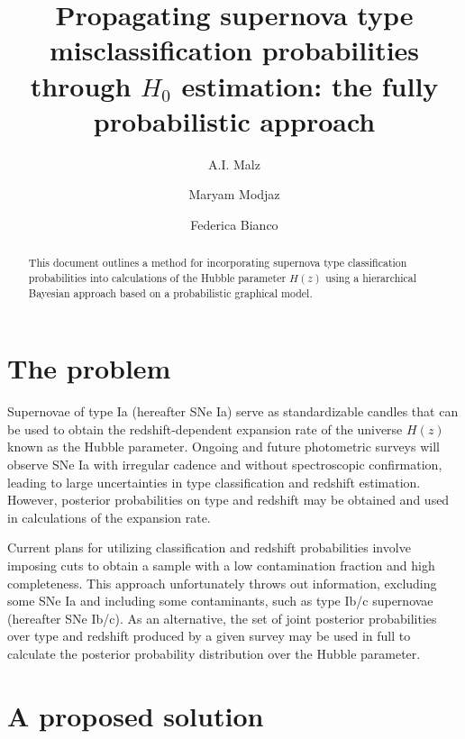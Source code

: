 \documentclass[12pt, onecolumn]{emulateapj}
\begin{document}
\title{Propagating supernova type misclassification probabilities through $H_{0}$ estimation: the fully probabilistic approach}

\author{A.I. Malz}
\author{Maryam Modjaz}
\author{Federica Bianco}

\begin{abstract}
This document outlines a method for incorporating supernova type classification probabilities into calculations of the Hubble parameter $H(z)$ using a hierarchical Bayesian approach based on a probabilistic graphical model.
\end{abstract}

\keywords{}

\section{The problem}
\label{sec:intro}

Supernovae of type Ia (hereafter SNe Ia) serve as standardizable candles that can be used to obtain the redshift-dependent expansion rate of the universe $H(z)$ known as the Hubble parameter.  Ongoing and future photometric surveys will observe SNe Ia with irregular cadence and without spectroscopic confirmation, leading to large uncertainties in type classification and redshift estimation.  However, posterior probabilities on type and redshift may be obtained and used in calculations of the expansion rate.  

Current plans for utilizing classification and redshift probabilities involve imposing cuts to obtain a sample with a low contamination fraction and high completeness.  This approach unfortunately throws out information, excluding some SNe Ia and including some contaminants, such as type Ib/c supernovae (hereafter SNe Ib/c).  As an alternative, the set of joint posterior probabilities over type and redshift produced by a given survey may be used in full to calculate the posterior probability distribution over the Hubble parameter.  

\section{A proposed solution}
\label{sec:confrac}
\end{document}
